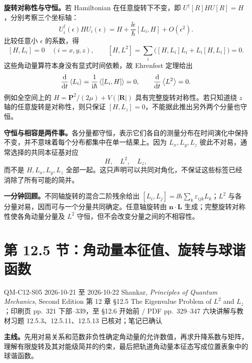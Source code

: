 \textbf{旋转对称性与守恒。}若 Hamiltonian 在任意旋转下不变，即 $U^\dagger[R]HU[R]=H$，分别考察三个坐标轴：
\begin{equation}
  U_i^\dagger(\epsilon)HU_i(\epsilon)
  =H+\frac{\ii\epsilon}{\hbar}[L_i,H]+O(\epsilon^2).
\end{equation}
比较任意小 $\epsilon$ 的系数，得
\begin{equation}
  \boxed{[H,L_i]=0\quad(i=x,y,z)},\qquad
  [H,L^2]=\sum_i\bigl([H,L_i]L_i+L_i[H,L_i]\bigr)=0.
\end{equation}
这些角动量算符本身没有显式时间依赖，故 Ehrenfest 定理给出
\begin{equation}
  \frac{\mathop{}\!\mathrm{d}}{\mathop{}\!\mathrm{d} t}\left\langle L_i \right\rangle
    =\frac{1}{\mathrm{i}\hbar}\left\langle [L_i,H] \right\rangle=0,\qquad
  \frac{\mathop{}\!\mathrm{d}}{\mathop{}\!\mathrm{d} t}\left\langle L^2 \right\rangle=0.
\end{equation}
例如全空间上的 $H=\mathbf P^2/(2\mu)+V(|\mathbf R|)$ 具有完整旋转对称性。若只知道绕 $z$ 轴的任意旋转是对称性，则只保证 $[H,L_z]=0$，不能据此推出另外两个分量也守恒。

\textbf{守恒与相容是两件事。}各分量都守恒，表示它们各自的测量分布在时间演化中保持不变，并不意味着每个分布都集中在单一结果上。因为 $L_x,L_y,L_z$ 彼此不对易，通常选择的共同本征基对应
\begin{equation}
  \boxed{H,\quad L^2,\quad L_z,}
\end{equation}
而不是 $H,L_x,L_y,L_z$ 全部一起。这只声明可以共同对角化，不保证这些标签已经消除了所有可能的简并。

\textbf{一分钟回顾。}不同轴旋转的混合二阶残余给出 $[L_i,L_j]=\ii\hbar\sum_k\varepsilon_{ijk}L_k$；$L^2$ 与各分量对易，因而可与一个分量共同确定。任意轴旋转由 $\mathbf n\cdot\mathbf L$ 生成；完整旋转对称性使各角动量分量及 $L^2$ 守恒，但不会改变分量之间的不相容性。

\section{第 12.5 节：角动量本征值、旋转与球谐函数}
\label{section:QM-C12-S05}
\studymeta
  {QM-C12-S05}
  {2026-10-21 至 2026-10-22}
  {Shankar, \textit{Principles of Quantum Mechanics}, Second Edition}
  {第 12 章 \S 12.5 The Eigenvalue Problem of $L^2$ and $L_z$；印刷页 pp.~321 下部--339，至 \S 12.6 开始前 / PDF pp.~329--347}
  {六块讲解与教材习题 12.5.3、12.5.11、12.5.13 已核对；笔记已确认}

\textbf{主线。}先用对易关系和范数非负性确定角动量的允许数值，再求升降系数与矩阵，理解有限旋转及其对能级简并的约束，最后把轨道角动量本征态写成位置表象中的球谐函数。

